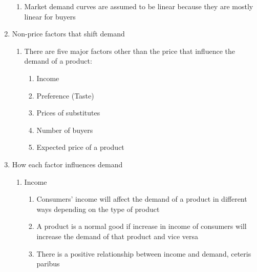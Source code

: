 \documentclass[12pt]{article}
\begin{document}
\begin{enumerate}
\begin{enumerate}
          \item Market demand curves are assumed to be linear because they are mostly linear for buyers

        \end{enumerate}

      \item Non-price factors that shift demand

        \begin{enumerate}

          \item There are five major factors other than the price that influence the demand of a product:

            \begin{enumerate}

              \item Income

              \item Preference (Taste)

              \item Prices of substitutes

              \item Number of buyers

              \item Expected price of a product

            \end{enumerate}

        \end{enumerate}

      \item How each factor influences demand

        \begin{enumerate}

          \item Income

            \begin{enumerate}

              \item Consumers' income will affect the demand of a product in different ways depending on the type of product

              \item A product is a normal good if increase in income of consumers will increase the demand of that product and vice versa

              \item There is a positive relationship between income and demand, ceteris paribus


\end{enumerate}
\end{enumerate}
\end{enumerate}
\end{document}
